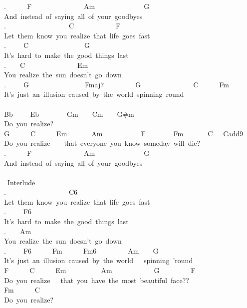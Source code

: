 {.\ \ \ \ \ \ F\ \ \ \ \ \ \ \ \ \ \ \ \ \ \ Am\ \ \ \ \ \ \ \ \ \ \ \ \ \ G\\
And\ instead\ of\ saying\ all\ of\ your\ goodbyes\\
.\ \ \ \ \ \ \ \ \ \ \ \ \ \ \ \ \ \ C\ \ \ \ \ \ \ \ \ \ \ \ F\\
Let\ them\ know\ you\ realize\ that\ life\ goes\ fast\\
.\ \ \ \ \ C\ \ \ \ \ \ \ \ \ \ \ \ \ \ \ \ G\\
It's\ hard\ to\ make\ the\ good\ things\ last\\
.\ \ \ \ C\ \ \ \ \ \ \ \ \ \ \ \ \ \ \ Em\ \\
You\ realize\ the\ sun\ doesn't\ go\ down\\
.\ \ \ \ \ G\ \ \ \ \ \ \ \ \ \ \ \ \ \ \ \ Fmaj7\ \ \ \ \ \ \ \ \ G\ \ \ \ \ \ \ \ \ \ \ \ \ \ \ C\ \ \ \ \ \ Fm\\
It's\ just\ an\ illusion\ caused\ by\ the\ world\ spinning\ round\\
\\
Bb\ \ \ \ \ Eb\ \ \ \ \ \ \ \ Gm\ \ \ \ Cm\ \ \ \ G\#m\\
Do\ you\ realize?\\
G\ \ \ \ \ \ C\ \ \ \ \ \ Em\ \ \ \ \ \ \ Am\ \ \ \ \ \ \ \ \ \ \ F\ \ \ \ \ \ \ \ Fm\ \ \ \ \ \ \ C\ \ \ Cadd9\ \\
Do\ you\ realize\ \ \ \ that\ everyone\ you\ know\ someday\ will\ die?\\
.\ \ \ \ \ \ F\ \ \ \ \ \ \ \ \ \ \ \ \ \ \ Am\ \ \ \ \ \ \ \ \ \ \ \ \ \ G\\
And\ instead\ of\ saying\ all\ of\ your\ goodbyes\\
\\
\lbrack\ Interlude\rbrack\\
.\ \ \ \ \ \ \ \ \ \ \ \ \ \ \ \ \ \ C6\\
Let\ them\ know\ you\ realize\ that\ life\ goes\ fast\\
.\ \ \ \ \ F6\  \\
It's\ hard\ to\ make\ the\ good\ things\ last\\
.\ \ \ \ Am\ \ \ \ \ \ \ \ \ \ \ \ \ \ \ \\
You\ realize\ the\ sun\ doesn't\ go\ down\\
.\ \ \ \ \ F6\  \ \ \ \ \ Fm\ \ \ \ \ \ Fm6\ \ \ \ \ \ \ \ \ Am\ \ \ \ G\\
It's\ just\ an\ illusion\ caused\ by\ the\ world\ \ \ spinning\ 'round\\
F\ \ \ \ \ \ C\ \ \ \ \ \ Em\ \ \ \ \ \ \ \ \ \ Am\ \ \ \ \ \ \ \ \ \ \ \ G\ \ \ \ \ \ \ \ \ F\\
Do\ you\ realize\ \ \ that\ you\ have\ the\ most\ beautiful\ face??\\
Fm\ \ \ \ \ \ C\\
Do\ you\ realize?
\iffalse
\fi
}
